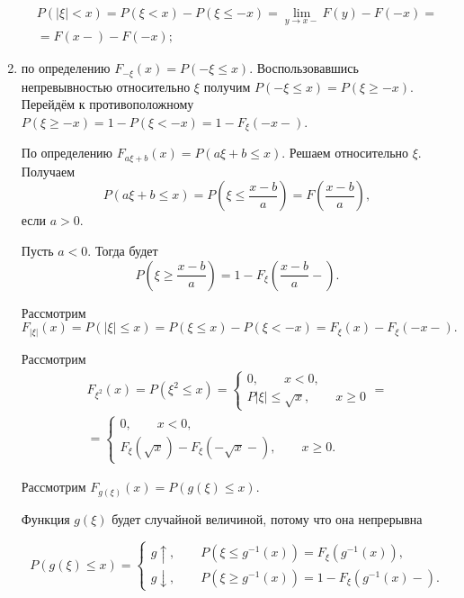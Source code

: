 \begin{enumerate}[label=\alph*)]
\begin{equation*}
\begin{split}
P \left( \left| \xi \right| < x \right) =
P \left( \xi < x \right) - P \left( \xi \leq - x \right) =
\lim \limits_{y \to x-} F \left( y \right) - F \left( -x \right) = \\
= F \left( x- \right) - F \left( -x \right);
\end{split}
\end{equation*}
\item  по определению $F_{- \xi} \left( x \right) = P \left( - \xi \leq x \right) $.
Воспользовавшись непревывностью относительно $ \xi $ получим $P \left( - \xi \leq x \right) = P \left( \xi \geq -x \right) $.
Перейдём к противоположному $P \left( \xi \geq -x \right) = 1 - P \left( \xi < -x \right) = 1 - F_{ \xi } \left( -x- \right) $.

По определению $F_{a \xi + b} \left( x \right) = P \left( a \xi + b \leq x \right) $.
Решаем относительно $ \xi $.
Получаем
$$P \left( a \xi + b \leq x \right) =
P \left( \xi \leq \frac{x-b}{a} \right) =
F \left( \frac{x-b}{a} \right),$$
если $a > 0$.

Пусть $a < 0$.
Тогда будет
$$P \left( \xi \geq \frac{x-b}{a} \right) =
1 - F_{ \xi } \left( \frac{x-b}{a} - \right).$$

Рассмотрим
$$F_{\left| \xi \right| } \left( x \right) =
P \left( \left| \xi \right| \leq x \right) =
P \left( \xi \leq x \right) - P \left( \xi < -x \right) =
F_{ \xi } \left( x \right) - F_{ \xi } \left( -x- \right).$$

Рассмотрим
\begin{equation*}
\begin{split}
F_{ \xi^2} \left( x \right) =
P \left( \xi^2 \leq x \right) =
\begin{cases}
0, \qquad x < 0, \\
P \left| \xi \right| \leq \sqrt{x}, \qquad x \geq 0
\end{cases} = \\
=
\begin{cases}
0, \qquad x < 0, \\
F_{ \xi } \left( \sqrt{x} \right) - F_{ \xi } \left( - \sqrt{x}- \right), \qquad x \geq 0.
\end{cases}
\end{split}
\end{equation*}

Рассмотрим $F_{g \left( \xi \right) } \left( x \right) = P \left( g \left( \xi \right) \leq x \right) $.

Функция $g \left( \xi \right) $ будет случайной величиной, потому что она непрерывна

$$P \left( g \left( \xi \right) \leq x \right) =
\begin{cases}
g \uparrow, \qquad P \left( \xi \leq g^{-1} \left( x \right) \right) = F_{ \xi } \left( g^{-1} \left( x \right) \right), \\
g \downarrow, \qquad P \left( \xi \geq g^{-1} \left( x \right) \right) = 1 - F_{ \xi } \left( g^{-1} \left( x \right) - \right).
\end{cases}$$
\end{enumerate}

